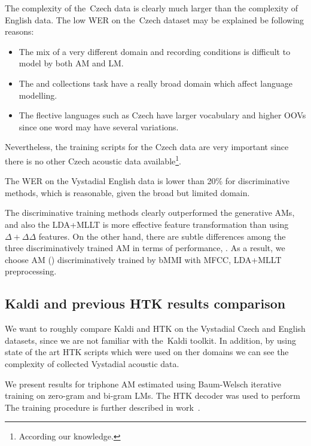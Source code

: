The complexity of the~Czech data is clearly much larger than the complexity of English data.
The low \ac{WER} on the~Czech dataset may be explained be following reasons:
\begin{itemize}
    \item The mix of a very different domain and recording conditions is difficult to model by both \ac{AM} and \ac{LM}. 
    \item The  and  collections task have a really broad domain which affect language modelling.
    \item The flective languages such as Czech have larger vocabulary and higher \acp{OOV} since one word may have several variations.
\end{itemize}
Nevertheless, the training scripts for the Czech data are very important since there is no other Czech acoustic data available\footnote{According our knowledge.}.

The \ac{WER} on the Vystadial English data is lower than 20\% for discriminative methods, which is reasonable, given the broad but limited domain.

The discriminative training methods clearly outperformed the generative \acp{AM}, and also the \ac{LDA}+\ac{MLLT} is more effective feature transformation than using $\Delta+\Delta\Delta$ features.
On the other hand, there are subtle differences among the three discriminatively trained \ac{AM} in terms of performance, .
As a result, we choose \ac{AM} () discriminatively trained by \ac{bMMI} with \ac{MFCC}, \ac{LDA}+\ac{MLLT} preprocessing. 


\subsection[Kaldi and \acs{HTK} comparison]{Kaldi and previous \ac{HTK} results comparison} 
\label{sec:compare}

We want to roughly compare Kaldi and HTK on the Vystadial Czech and English datasets, since we are not familiar with the~Kaldi toolkit.
In addition, by using state of the art \ac{HTK} scripts which were used on ther domains we can see the complexity of collected Vystadial acoustic data.

We present results for triphone \ac{AM} estimated using Baum-Welsch iterative training on zero-gram and bi-gram \acp{LM}.
The  \ac{HTK} decoder was used to perform  
The training procedure is further described in work~\cite{korvas_2014}.

